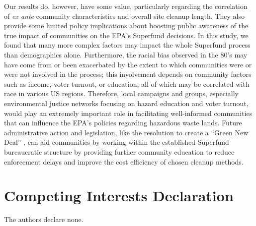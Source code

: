 \documentclass[12pt]{article}
\begin{document}
{Our results do, however, have some value, particularly regarding the correlation of \textit{ex ante} community characteristics and overall site cleanup length. They also provide some limited policy implications about boosting public awareness of the true impact of communities on the EPA's Superfund decisions. In this study, we found that many more complex factors may impact the whole Superfund process than demographics alone. Furthermore, the racial bias observed in the 80's may have come from or been exacerbated by the extent to which communities were or were not involved in the process; this involvement depends on community factors such as income, voter turnout, or education, all of which may be correlated with race in various US regions. Therefore, local campaigns and groups, especially environmental justice networks focusing on hazard education and voter turnout, would play an extremely important role in facilitating well-informed communities that can influence the EPA's policies regarding hazardous waste lands. Future administrative action and legislation, like the resolution to create a ``Green New Deal'' \parencite{Ocasio-Cortez2019}, can aid communities by working within the established Superfund bureaucratic structure by providing further community education to reduce enforcement delays and improve the cost efficiency of chosen cleanup methods. 




\section*{Competing Interests Declaration}

The authors declare none. 

\renewcommand*{\bibfont}{\normalfont\small}
\printbibliography









}
\end{document}
